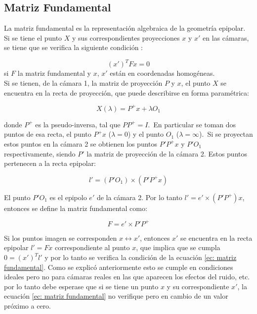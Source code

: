 \subsection{Matriz Fundamental}

La matriz fundamental es la representación algebraica de la geometría epipolar. Si se tiene el punto $X$ y sus correspondientes proyecciones $x$ y $x'$ en las cámaras, se tiene que se verifica la siguiente condición :

\begin{equation}
(x')^T F x = 0
\label{ec: matriz fundamental}
\end{equation}
si  $F$ la matriz fundamental y $x$, $x'$ están en coordenadas homogéneas.\\

Si se tienen, de la cámara 1, la matriz de proyección $P$ y $x$, el punto $X$ se encuentra en la recta de proyección, que puede describirse en forma paramétrica:

\begin{equation}
	X(\lambda) = P^+x+\lambda O_1
\end{equation}

donde $P^+$ es la pseudo-inversa, tal que $PP^+=I$.\
En particular se toman dos puntos de esa recta, el punto $P^+x$ ($\lambda = 0$) y el punto $O_1$ ($\lambda = \infty$).\
Si se proyectan estos puntos en la cámara 2 se obtienen los puntos $P'P^+x$ y $P'O_1$ respectivamente, siendo $P'$ la matriz de proyección de la cámara 2. Estos puntos pertenecen a la recta epipolar:

\begin{equation}
l' = (P'O_1) \times (P'P^+ x)
\end{equation}

El punto $P'O_1$ es el epipolo $e'$ de la cámara 2. Por lo tanto $l' = e' \times (P'P^+) x$, entonces se define la matriz fundamental como:

\begin{equation}
F=e' \times P'P^+
\end{equation}

Si los puntos imagen se corresponden $x \leftrightarrow x'$, entonces $x'$ se encuentra en la recta epipolar $l'=Fx$ correspondiente al punto $x$, que implica que se cumpla $0=(x')^Tl'$ y por lo tanto se verifica la condición de la ecuación \ref{ec: matriz fundamental}. Como se explicó anteriormente esto se cumple en condiciones ideales pero no para cámaras reales en las que aparecen los efectos del ruido, etc. por lo tanto debe esperase que si se tiene un punto $x$ y su correspondiente $x'$, la ecuación \ref{ec: matriz fundamental} no verifique pero en cambio de un valor próximo a cero.\\

